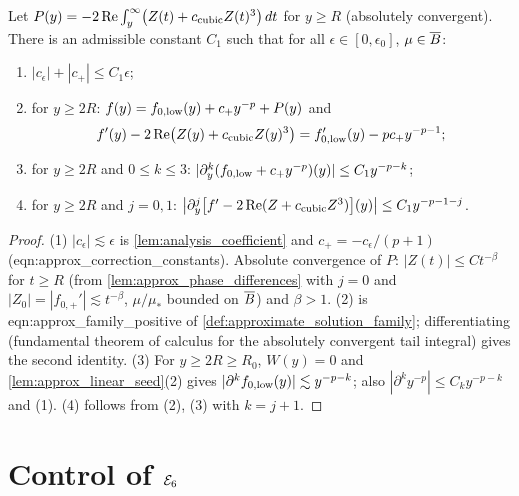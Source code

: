 \begin{lemma}
  \label{lem:c06_positive_representation}
  Let $P(y)=-2\operatorname{Re}\int_y^\infty\bigl(Z(t)+c_{\textup{cubic}}Z(t)^3\bigr)\,dt$ for $y\geq R$
  (absolutely convergent). There is an admissible constant $C_1$ such that for all $\epsilon\in[0,\epsilon_0]$, $\mu\in\overline{B}$:
  \begin{enumerate}
    \item $|c_\epsilon|+|c_+|\leq C_1\epsilon$;
    \item for $y\geq2R$: $f(y)=f_{0,\textup{low}}(y)+c_+y^{-p}+P(y)$ and
      \[f'(y)-2\operatorname{Re}\bigl(Z(y)+c_{\textup{cubic}}Z(y)^3\bigr)=f_{0,\textup{low}}'(y)-pc_+y^{-p-1};\]
    \item for $y\geq2R$ and $0\le k\le3$: $|\partial_y^k(f_{0,\textup{low}}+c_+y^{-p})(y)|\leq C_1y^{-p-k}$;
    \item for $y\geq2R$ and $j=0,1$: $\bigl|\partial_y^j\bigl[f'-2\operatorname{Re}(Z+c_{\textup{cubic}}Z^3)\bigr](y)\bigr|\leq C_1y^{-p-1-j}$.
  \end{enumerate}
\end{lemma}
\begin{proof}
  (1) $|c_\epsilon|\lesssim\epsilon$ is \cref{lem:analysis_coefficient} and $c_+=-c_\epsilon/(p+1)$
  (eqn:approx\_correction\_constants).
  Absolute convergence of $P$: $|Z(t)|\le C t^{-\beta}$ for $t\geq R$ (from \cref{lem:approx_phase_differences}
  with $j=0$ and $|Z_0|=|f_{0,+}'|\lesssim t^{-\beta}$, $\mu/\mu_*$ bounded on $\overline{B}$) and $\beta>1$.
  (2) is eqn:approx\_family\_positive of \cref{def:approximate_solution_family}; differentiating
  (fundamental theorem of calculus for the absolutely convergent tail integral) gives the second identity.
  (3) For $y\geq2R\geq R_0$, $W(y)=0$ and \cref{lem:approx_linear_seed}(2) gives
  $|\partial^k f_{0,\textup{low}}(y)|\lesssim y^{-p-k}$; also $|\partial^k y^{-p}|\le C_k y^{-p-k}$ and (1).
  (4) follows from (2), (3) with $k=j+1$.
\end{proof}

\section{Control of $\mathcal{E}_6$}

